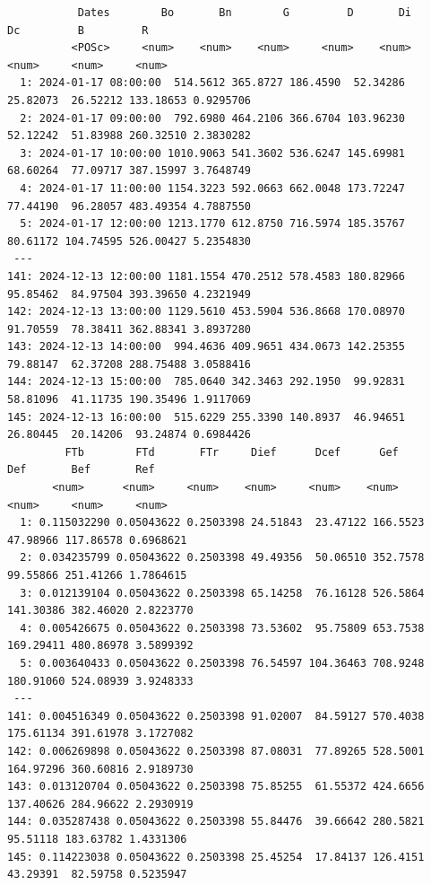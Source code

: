 \begin{itemize}
\begin{verbatim}
		   Dates        Bo       Bn        G         D       Di        Dc         B         R
		  <POSc>     <num>    <num>    <num>     <num>    <num>     <num>     <num>     <num>
  1: 2024-01-17 08:00:00  514.5612 365.8727 186.4590  52.34286 25.82073  26.52212 133.18653 0.9295706
  2: 2024-01-17 09:00:00  792.6980 464.2106 366.6704 103.96230 52.12242  51.83988 260.32510 2.3830282
  3: 2024-01-17 10:00:00 1010.9063 541.3602 536.6247 145.69981 68.60264  77.09717 387.15997 3.7648749
  4: 2024-01-17 11:00:00 1154.3223 592.0663 662.0048 173.72247 77.44190  96.28057 483.49354 4.7887550
  5: 2024-01-17 12:00:00 1213.1770 612.8750 716.5974 185.35767 80.61172 104.74595 526.00427 5.2354830
 ---                                                                                                 
141: 2024-12-13 12:00:00 1181.1554 470.2512 578.4583 180.82966 95.85462  84.97504 393.39650 4.2321949
142: 2024-12-13 13:00:00 1129.5610 453.5904 536.8668 170.08970 91.70559  78.38411 362.88341 3.8937280
143: 2024-12-13 14:00:00  994.4636 409.9651 434.0673 142.25355 79.88147  62.37208 288.75488 3.0588416
144: 2024-12-13 15:00:00  785.0640 342.3463 292.1950  99.92831 58.81096  41.11735 190.35496 1.9117069
145: 2024-12-13 16:00:00  515.6229 255.3390 140.8937  46.94651 26.80445  20.14206  93.24874 0.6984426
	     FTb        FTd       FTr     Dief      Dcef      Gef       Def       Bef       Ref
	   <num>      <num>     <num>    <num>     <num>    <num>     <num>     <num>     <num>
  1: 0.115032290 0.05043622 0.2503398 24.51843  23.47122 166.5523  47.98966 117.86578 0.6968621
  2: 0.034235799 0.05043622 0.2503398 49.49356  50.06510 352.7578  99.55866 251.41266 1.7864615
  3: 0.012139104 0.05043622 0.2503398 65.14258  76.16128 526.5864 141.30386 382.46020 2.8223770
  4: 0.005426675 0.05043622 0.2503398 73.53602  95.75809 653.7538 169.29411 480.86978 3.5899392
  5: 0.003640433 0.05043622 0.2503398 76.54597 104.36463 708.9248 180.91060 524.08939 3.9248333
 ---                                                                                           
141: 0.004516349 0.05043622 0.2503398 91.02007  84.59127 570.4038 175.61134 391.61978 3.1727082
142: 0.006269898 0.05043622 0.2503398 87.08031  77.89265 528.5001 164.97296 360.60816 2.9189730
143: 0.013120704 0.05043622 0.2503398 75.85255  61.55372 424.6656 137.40626 284.96622 2.2930919
144: 0.035287438 0.05043622 0.2503398 55.84476  39.66642 280.5821  95.51118 183.63782 1.4331306
145: 0.114223038 0.05043622 0.2503398 25.45254  17.84137 126.4151  43.29391  82.59758 0.5235947
\end{verbatim}
\end{itemize}
